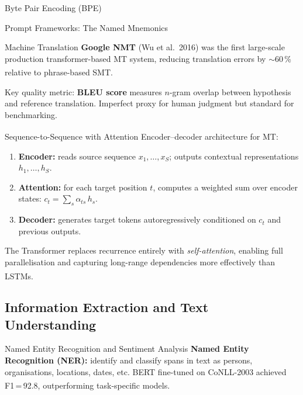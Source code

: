 \begin{v3topic}{Byte Pair Encoding (BPE)}
\begin{v3topic}{Prompt Frameworks: The Named Mnemonics}
\begin{v3topic}{Machine Translation}
    \textbf{Google NMT} (Wu et al.\ 2016) was the first large-scale production
    transformer-based MT system, reducing translation errors by $\sim$60\,\% relative to
    phrase-based
    SMT.\textsuperscript{\cite[][p.~9]{dhamaniIntroductionGenerativeAI2024}}

    Key quality metric: \textbf{BLEU score} measures $n$-gram overlap between hypothesis
    and reference translation. Imperfect proxy for human judgment but standard for
    benchmarking.

\end{v3topic}
\begin{v3topic}{Sequence-to-Sequence with Attention}
    Encoder--decoder architecture for
    MT:\textsuperscript{\cite[][p.~7-8]{dhamaniIntroductionGenerativeAI2024}}
    \begin{enumerate}
        \item \textbf{Encoder:} reads source sequence $x_1,\ldots,x_S$; outputs
              contextual representations $h_1,\ldots,h_S$.
        \item \textbf{Attention:} for each target position $t$, computes a weighted sum
              over encoder states:
              $c_t = \sum_s \alpha_{ts}\,h_s$.
        \item \textbf{Decoder:} generates target tokens autoregressively conditioned
              on $c_t$ and previous outputs.
    \end{enumerate}
    The Transformer replaces recurrence entirely with \emph{self-attention}, enabling
    full parallelisation and capturing long-range dependencies more effectively than
    LSTMs.\textsuperscript{\cite[][]{vaswaniAttentionAllYou2023}}

\end{v3topic}

\subsection{Information Extraction and Text Understanding}


\begin{v3topic}{Named Entity Recognition and Sentiment Analysis}
    \textbf{Named Entity Recognition (NER):} identify and classify spans in text as
    persons, organisations, locations, dates, etc. BERT fine-tuned on CoNLL-2003 achieved
    F1\,=\,92.8, outperforming task-specific
    models.\textsuperscript{\cite[][p.~6]{devlinBERTPretrainingDeep2019}}


\end{v3topic}
\end{v3topic}
\end{v3topic}
